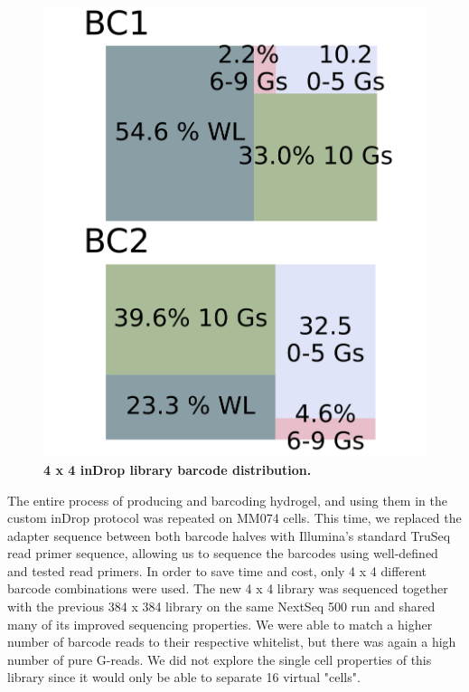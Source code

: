\begin{figure}
\centering
\includegraphics[width=\textwidth/3]{./ims/seq_ind4_bcdist.png}
\caption[4 x 4 inDrop library barcode distribution.]{\textbf{4 x 4 inDrop library barcode distribution.}}
\label{fig:seq_ind4_bcdist}
\vspace{-20pt}
\end{figure}

The entire process of producing and barcoding hydrogel, and using them in the custom inDrop protocol was repeated on MM074 cells. This time, we replaced the adapter sequence between both barcode halves with Illumina's standard TruSeq read primer sequence, allowing us to sequence the barcodes using well-defined and tested read primers. In order to save time and cost, only 4 x 4 different barcode combinations were used. The new 4 x 4 library was sequenced together with the previous 384 x 384 library on the same NextSeq 500 run and shared many of its improved sequencing properties. We were able to match a higher number of barcode reads to their respective whitelist, but there was again a high number of pure G-reads. We did not explore the single cell properties of this library since it would only be able to separate 16 virtual "cells".\pms


